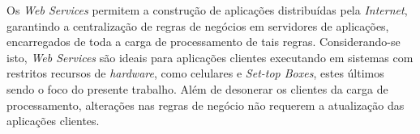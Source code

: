 Os \textit{Web Services} permitem a construção de aplicações distribuídas pela \textit{Internet}, garantindo a centralização
de regras de negócios em servidores de aplicações, encarregados de toda a carga de processamento
de tais regras. Considerando-se isto, \textit{Web Services} são ideais para aplicações clientes executando em
sistemas com restritos recursos de \textit{hardware}, como celulares e \textit{Set-top Boxes}, estes últimos
sendo o foco do presente trabalho. Além de desonerar os clientes da carga de processamento, alterações nas regras
de negócio não requerem a atualização das aplicações clientes.

\begin{comment}
\subsection{O protocolo HTTP}

O \textit{Hyper Text Transfer Protocol} (HTTP) é um protocolo de comunicação (da camada de aplicação do modelo OSI) 
utilizado para a transferência de hipertexto pela Web. 
Ele é uma especificação da W3C e da \textit{Internet Engeneering Task Force} (IETF), cuja versão mais recente, o HTTP 1.1,
é definido pela RFC 2616 \cite{rfc2616}.

O HTTP é um dos protocolos mais populares na Web, utilizado pela grande maioria dos serviços hospedados na núvem.
Ele é um protocolo baseado no modelo cliente/servidor de requisição/resposta. 
Por padrão ele trafega dados utilizando a porta 80 
(normalmente liberada para navegação na Web), sendo, desta forma, amigável a \textit{firewalls}. 
Com isto, o protocolo permite a comunicação entre
aplicações por meio da Intenet. Desta forma, o HTTP é o principal protocolo de transporte utilizado
por aplicações SOAP. Ele define um formato simples e padronizado para a tranferência de documentos como HTML e XML,
este último, utilizado nas trocas de mensagens do protocolo SOAP.

O protocolo há bastante tempo é uma tecnologia universalizada na Web, e sua simplicidade 
e concisão garantem que ele não aumente a latência da transmissão e nem o processamento das mensagens
enviadas e recebidas. Desta forma, ele pode ser utilizado sem problemas 
em redes com banda estreita e dispositivos com recursos de hardware restritos.

A sua natureza independente de linguagem e plataforma, permite que hajam diversas implementações 
do protocolo. Na parte servidora do mesmo, sua implementação é integrada em softwares conhecidos
como servidores \textit{Web}/HTTP.


\end{comment}

